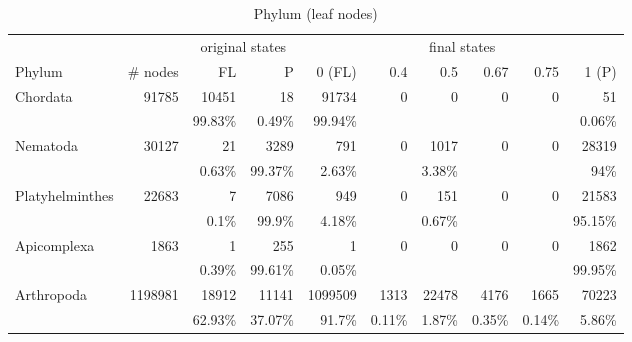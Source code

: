       \begin{table}
        \begin{center}
          \hspace*{-1cm}\begin{tabular}{ |l|r||r|r||r|r|r|r|r|r| }
            \hline
            & & \multicolumn{2}{c||}{original states} & \multicolumn{6}{c|}{final states} \\
            Phylum & \# nodes & FL & P
              & 0 (FL) & 0.4 & 0.5 & 0.67 & 0.75 & 1 (P) \\
            \hline \hline
            Chordata & 91785 & 10451 & 18 
              & 91734 & 0 & 0 & 0 & 0 & 51 \\
            & & 99.83\% & 0.49\%
              & 99.94\% & & & & & 0.06\% \\ \hline
            Nematoda & 30127 & 21 & 3289 
              & 791 & 0 & 1017 & 0 & 0 & 28319 \\
            & & 0.63\% & 99.37\%
              & 2.63\% & & 3.38\% & & & 94\% \\ \hline
            Platyhelminthes & 22683 & 7 & 7086 
              & 949 & 0 & 151 & 0 & 0 & 21583 \\
            & & 0.1\% & 99.9\%
              & 4.18\% & & 0.67\% & & & 95.15\% \\ \hline
            Apicomplexa & 1863 & 1 & 255 
              & 1 & 0 & 0 & 0 & 0 & 1862 \\
            & & 0.39\% & 99.61\%
              & 0.05\% & & & & & 99.95\% \\
            \hline \hline
            Arthropoda & 1198981 & 18912 & 11141 
              & 1099509 & 1313 & 22478 & 4176 & 1665 & 70223 \\
            & & 62.93\% & 37.07\%
              & 91.7\% & 0.11\% & 1.87\% & 0.35\% & 0.14\% & 5.86\% \\
            \hline
          \end{tabular} 
        \end{center}
        \caption{Phylum (leaf nodes)}
        \label{table:phylum leaf nodes states} 
      \end{table}

       \\

